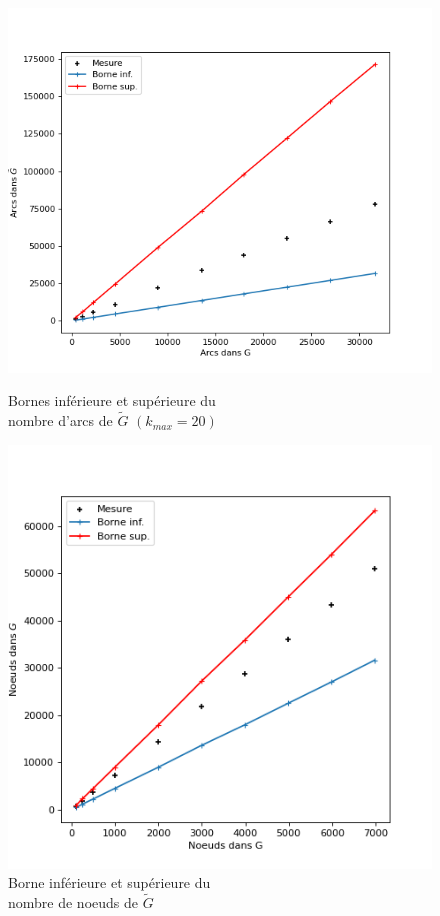 \documentclass{article}
\begin{document}
\begin{figure}[h]
    \centering
    \begin{minipage}{.5\textwidth}
      \centering
      \includegraphics[scale=0.43]{vert_g_gtilde.png}
      \caption{Bornes inférieure et supérieure du\\nombre d'arcs de $\tilde{G}$ $(k_{max} = 20)$}
    \end{minipage}%
    \begin{minipage}{.5\textwidth}
      \centering
      \includegraphics[scale=0.45]{size_g_gtilde.png}
      \caption{Borne inférieure et supérieure du\\nombre de noeuds de $\tilde{G}$}
    \end{minipage}
\end{figure}
\end{document}
